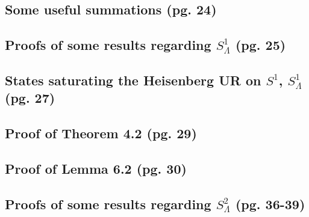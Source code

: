 \documentclass{article}
\begin{document}
\subsection{Some useful summations (pg. 24)}

\subsection{Proofs of some results regarding $S^1_\Lambda$ (pg. 25)}

\subsection{States saturating the Heisenberg UR on $S^1$, $S^1_\Lambda$ (pg. 27)}

\subsection{Proof of Theorem 4.2 (pg. 29)}

\subsection{Proof of Lemma 6.2 (pg. 30)}

\subsection{Proofs of some results regarding $S^2_\Lambda$ (pg. 36-39)}
\end{document}
